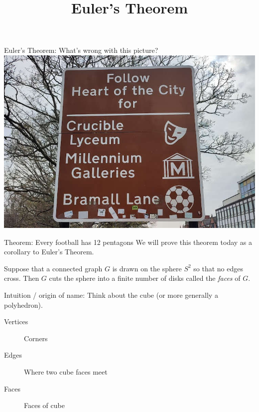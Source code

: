 \documentclass{beamer}
\title{Euler's Theorem}
\begin{document}
\begin{frame}{Euler's Theorem: What's wrong with this picture?}
            \includegraphics[width=\textwidth]{Pictures/BadFootball.jpg}
\end{frame}

\begin{frame}{Theorem: Every football has 12 pentagons}
  We will prove this theorem today as a corollary to Euler's Theorem.

  \begin{definition} Suppose that a connected graph $G$ is drawn on the sphere $S^2$ so that no edges cross.  Then $G$ cuts the sphere into a finite number of disks called the \emph{faces} of $G$.
  \end{definition}

  \begin{block}{Intuition / origin of name:}
    Think about the cube (or more generally a polyhedron).
    \begin{description}
    \item[Vertices] Corners
      \item[Edges] Where two cube faces meet
       \item[Faces] Faces of cube
      \end{description}

    \end{block}
 
\end{frame}
\end{document}
